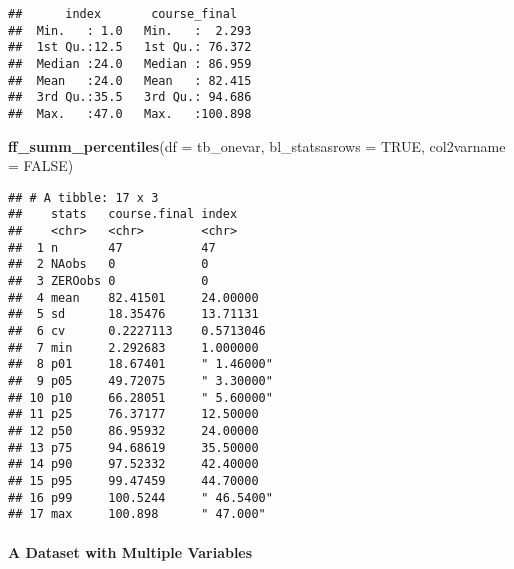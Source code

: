 \documentclass[
]{book}
\newenvironment{Shaded}{\begin{snugshade}}{\end{snugshade}}
\newcommand{\DataTypeTok}[1]{\textcolor[rgb]{0.13,0.29,0.53}{#1}}
\newcommand{\KeywordTok}[1]{\textcolor[rgb]{0.13,0.29,0.53}{\textbf{#1}}}
\newcommand{\NormalTok}[1]{#1}
\newcommand{\OtherTok}[1]{\textcolor[rgb]{0.56,0.35,0.01}{#1}}
\begin{document}
\begin{verbatim}
##      index       course_final    
##  Min.   : 1.0   Min.   :  2.293  
##  1st Qu.:12.5   1st Qu.: 76.372  
##  Median :24.0   Median : 86.959  
##  Mean   :24.0   Mean   : 82.415  
##  3rd Qu.:35.5   3rd Qu.: 94.686  
##  Max.   :47.0   Max.   :100.898
\end{verbatim}

\begin{Shaded}
\begin{Highlighting}[]
\KeywordTok{ff_summ_percentiles}\NormalTok{(}\DataTypeTok{df =}\NormalTok{ tb_onevar, }\DataTypeTok{bl_statsasrows =} \OtherTok{TRUE}\NormalTok{, }\DataTypeTok{col2varname =} \OtherTok{FALSE}\NormalTok{)}
\end{Highlighting}
\end{Shaded}

\begin{verbatim}
## # A tibble: 17 x 3
##    stats   course.final index     
##    <chr>   <chr>        <chr>     
##  1 n       47           47        
##  2 NAobs   0            0         
##  3 ZEROobs 0            0         
##  4 mean    82.41501     24.00000  
##  5 sd      18.35476     13.71131  
##  6 cv      0.2227113    0.5713046 
##  7 min     2.292683     1.000000  
##  8 p01     18.67401     " 1.46000"
##  9 p05     49.72075     " 3.30000"
## 10 p10     66.28051     " 5.60000"
## 11 p25     76.37177     12.50000  
## 12 p50     86.95932     24.00000  
## 13 p75     94.68619     35.50000  
## 14 p90     97.52332     42.40000  
## 15 p95     99.47459     44.70000  
## 16 p99     100.5244     " 46.5400"
## 17 max     100.898      " 47.000"
\end{verbatim}

\hypertarget{a-dataset-with-multiple-variables}{%
\paragraph{A Dataset with Multiple Variables}\label{a-dataset-with-multiple-variables}}
\end{document}
